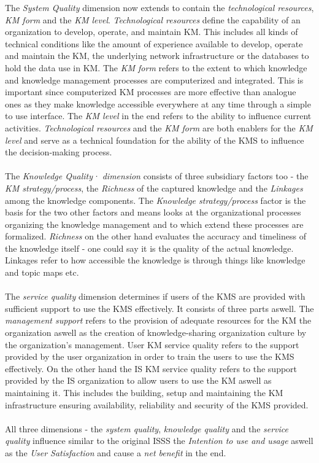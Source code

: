 \documentclass[
	english,
	ruledheaders=section,%
	class=report,%
	thesis={type=bachelor},%
	accentcolor=1b,%
	custommargins=true,%
	marginpar=false,%
	parskip=half-,%
	fontsize=11pt,%
	DIV=14,
]{tudapub}
\begin{document}
The \textit{System Quality} dimension now extends to contain the \textit{technological resources}, \textit{KM form} and the \textit{KM level}. \textit{Technological resources} define the capability of an organization to develop, operate, and maintain KM. This includes all kinds of technical conditions like the amount of experience available to develop, operate and maintain the KM, the underlying network infrastructure or the databases to hold the data use in KM. The \textit{KM form} refers to the extent to which knowledge and knowledge management processes are computerized and integrated. This is important since computerized KM processes are more effective than analogue ones as they make knowledge accessible everywhere at any time through a simple to use interface. The \textit{KM level} in the end refers to the ability to influence current activities. \textit{Technological resources} and the \textit{KM form} are both enablers for the \textit{KM level} and serve as a technical foundation for the ability of the KMS to influence the decision-making process.\\\\
The \textit{Knowledge Quality· dimension} consists of three subsidiary factors too - the \textit{KM strategy/process}, the \textit{Richness} of the captured knowledge and the \textit{Linkages} among the knowledge components. The \textit{Knowledge strategy/process} factor is the basis for the two other factors and means looks at the organizational processes organizing the knowledge management and to which extend these processes are formalized. \textit{Richness} on the other hand evaluates the accuracy and timeliness of the knowledge itself - one could say it is the quality of the actual knowledge. Linkages refer to how accessible the knowledge is through things like knowledge and topic maps etc.\\\\
The \textit{service quality} dimension determines if users of the KMS are provided with sufficient support to use the KMS effectively. It consists of three parts aswell. The \textit{management support} refers to the provision of adequate resources for the KM the organization aswell as the creation of knowledge-sharing organization culture by the organization's management. User KM service quality refers to the support provided by the user organization in order to train the users to use the KMS effectively. On the other hand the IS KM service quality refers to the support provided by the  IS organization to allow users to use the KM aswell as maintaining it. This includes the building, setup and maintaining the KM infrastructure ensuring availability, reliability and security of the KMS provided.\\\\
All three dimensions - the \textit{system quality}, \textit{knowledge quality} and the \textit{service quality} influence similar to the original ISSS the \textit{Intention to use and usage} aswell as the \textit{User Satisfaction} and cause a \textit{net benefit} in the end.
\end{document}
